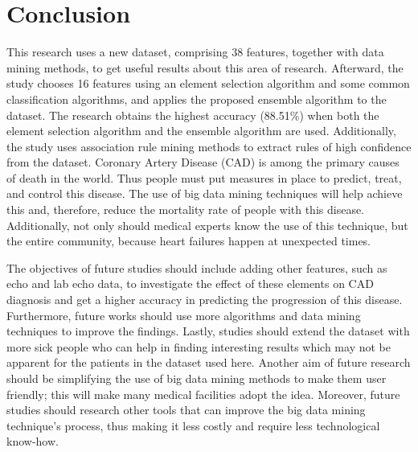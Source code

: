 \documentclass[sigconf]{acmart}
\begin{document}
\section{Conclusion}
This research uses a new dataset, comprising 38 features, together with data mining methods, to get useful results about this area of research.
Afterward, the study chooses 16 features using an element selection algorithm and some common classification algorithms, and applies the proposed ensemble algorithm to the dataset.
The research obtains the highest accuracy (88.51\%) when both the element selection algorithm and the ensemble algorithm are used.
Additionally, the study uses association rule mining methods to extract rules of high confidence from the dataset.
Coronary Artery Disease (CAD) is among the primary causes of death in the world.
Thus people must put measures in place to predict, treat, and control this disease.
The use of big data mining techniques will help achieve this and, therefore, reduce the mortality rate of people with this disease.
Additionally, not only should medical experts know the use of this technique, but the entire community, because heart failures happen at unexpected times.
\par The objectives of future studies should include adding other features, such as echo and lab echo data, to investigate the effect of these elements on CAD diagnosis and get a higher accuracy in predicting the progression of this disease.
Furthermore, future works should use more algorithms and data mining techniques to improve the findings.
Lastly, studies should extend the dataset with more sick people who can help in finding interesting results which may not be apparent for the patients in the  dataset used here.
Another aim of future research should be simplifying the use of big data mining methods to make them user friendly; this will make many medical facilities adopt the idea.
Moreover, future studies should research other tools that can improve the big data mining technique's process, thus making it less costly and require less technological know-how.
\end{document}
